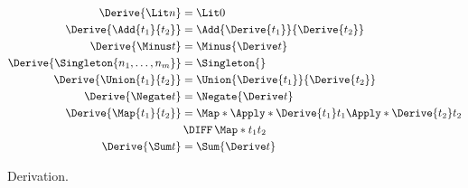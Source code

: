 \begin{figure}
\begin{align*}
\Derive{\Lit n}
& = \Lit0\\
\Derive{\Add{t_1}{t_2}}
& = \Add{\Derive{t_1}}{\Derive{t_2}}\\
\Derive{\Minus t}
& = \Minus{\Derive t}\\
\Derive{\Singleton{n_1,\ldots,n_m}}
& = \Singleton{}\\
\Derive{\Union{t_1}{t_2}}
& = \Union{\Derive{t_1}}{\Derive{t_2}}\\
\Derive{\Negate t}
& = \Negate{\Derive t}\\
\Derive{\Map{t_1}{t_2}}
& = {\Map*{\Apply*{\Derive{t_1}}{t_1}}
          {\Apply*{\Derive{t_2}}{t_2}}}\\
&\,\DIFF\, {\Map*{t_1}{t_2}}\\
\Derive{\Sum t}
& = {\Sum{\Derive t}}
\end{align*}
\caption{Derivation.}
\label{fig:plug-derive}
\end{figure}
